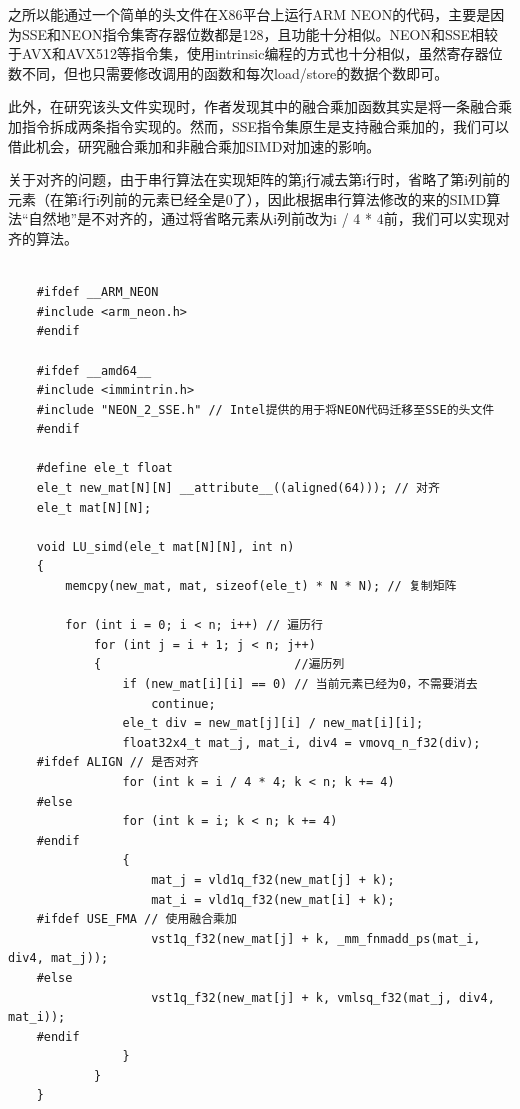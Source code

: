 \documentclass[a4paper]{article}
\begin{document}
之所以能通过一个简单的头文件在X86平台上运行ARM NEON的代码，主要是因为SSE和NEON指令集寄存器位数都是128，且功能十分相似。NEON和SSE相较于AVX和AVX512等指令集，使用intrinsic编程的方式也十分相似，虽然寄存器位数不同，但也只需要修改调用的函数和每次load/store的数据个数即可。

此外，在研究该头文件实现时，作者发现其中的融合乘加函数其实是将一条融合乘加指令拆成两条指令实现的。然而，SSE指令集原生是支持融合乘加的，我们可以借此机会，研究融合乘加和非融合乘加SIMD对加速的影响。

关于对齐的问题，由于串行算法在实现矩阵的第j行减去第i行时，省略了第i列前的元素（在第i行i列前的元素已经全是0了），因此根据串行算法修改的来的SIMD算法“自然地”是不对齐的，通过将省略元素从i列前改为i / 4 * 4前，我们可以实现对齐的算法。

\begin{verbatim}

    #ifdef __ARM_NEON
    #include <arm_neon.h>
    #endif
    
    #ifdef __amd64__
    #include <immintrin.h>
    #include "NEON_2_SSE.h" // Intel提供的用于将NEON代码迁移至SSE的头文件
    #endif
    
    #define ele_t float
    ele_t new_mat[N][N] __attribute__((aligned(64))); // 对齐
    ele_t mat[N][N];
    
    void LU_simd(ele_t mat[N][N], int n)
    {
        memcpy(new_mat, mat, sizeof(ele_t) * N * N); // 复制矩阵
    
        for (int i = 0; i < n; i++) // 遍历行
            for (int j = i + 1; j < n; j++)
            {                           //遍历列
                if (new_mat[i][i] == 0) // 当前元素已经为0，不需要消去
                    continue;
                ele_t div = new_mat[j][i] / new_mat[i][i];
                float32x4_t mat_j, mat_i, div4 = vmovq_n_f32(div);
    #ifdef ALIGN // 是否对齐
                for (int k = i / 4 * 4; k < n; k += 4)
    #else
                for (int k = i; k < n; k += 4)
    #endif
                {
                    mat_j = vld1q_f32(new_mat[j] + k);
                    mat_i = vld1q_f32(new_mat[i] + k);
    #ifdef USE_FMA // 使用融合乘加
                    vst1q_f32(new_mat[j] + k, _mm_fnmadd_ps(mat_i, div4, mat_j));
    #else
                    vst1q_f32(new_mat[j] + k, vmlsq_f32(mat_j, div4, mat_i));
    #endif
                }
            }
    }
\end{verbatim}
\end{document}
